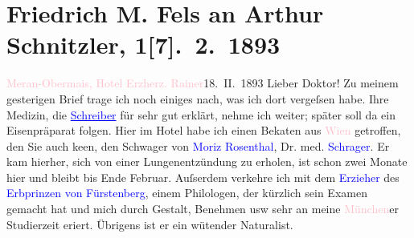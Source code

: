

               \section[Friedrich M. Fels an Arthur Schnitzler, 1{[}7{]}. 2. 1893]{ Friedrich M. Fels an Arthur Schnitzler, 1{[}7{]}. 2. 1893}\nopagebreak{}\rehead{ }\normalsize\beginnumbering{} \toendnotes[C]{\smallbreak\pagebreak[2]} 
\toendnotes[C]{\smallbreak}\pstart
           \raggedleft{}{\pb}\textcolor{pink}{Meran-Obermais, Hotel Erzherz. Rainer}{}\ledrightnote{\textcolor{pink}{Erzherzog Rainer}}{\\}18. II. 1893\pend
           \pstart{}Lieber Doktor!\pend\pstart
           Zu meinem gesterigen Brief trage ich noch einiges nach, was ich dort vergeſsen
                    habe.\pend
           \pstart
           Ihre Medizin, die \textcolor{blue}{\uline{Schreiber}}{}\ledrightnote{\textcolor{blue}{Joseph Schreiber}} für sehr gut erklärt, nehme ich weiter; später soll da{\geminationn} ein Eisenpräparat folgen.\pend
           \pstart
           Hier im Hotel habe ich einen Beka{\geminationn}ten aus \textcolor{pink}{Wien}{}\ledrightnote{\textcolor{pink}{Wien}} getroffen, den Sie auch ke{\geminationn}en, den Schwager von \textcolor{blue}{Moriz Rosenthal}{}\ledrightnote{\textcolor{blue}{Moritz Rosenthal}}, Dr. med. \textcolor{blue}{Schrager}{}\ledrightnote{\textcolor{blue}{Sigmund Schraga}}. Er kam hierher, sich von einer Lungenentzündung zu erholen,
                    ist schon zwei Monate hier und bleibt bis Ende Februar. Auſserdem
                    verkehre ich mit dem \textcolor{blue}{Erzieher}{} des \textcolor{blue}{Erbprinzen von Fürstenberg}{}, einem Philologen, der kürzlich sein Examen
                    gemacht hat und mich durch Gestalt, Benehmen usw sehr an meine \textcolor{pink}{München}{}\ledrightnote{\textcolor{pink}{München}}er Studierzeit eri{\geminationn}ert. Übrigens ist er ein wütender Naturalist.\pend
